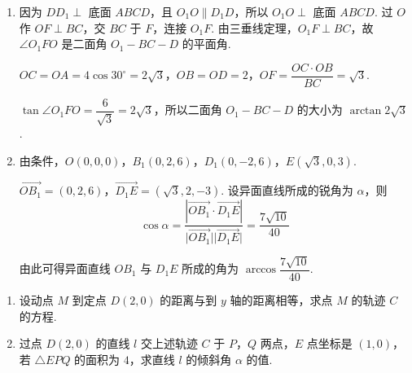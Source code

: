 \documentclass[UTF8,a4paper,oneside,11pt]{ctexbook}
\begin{document}
\begin{solution}
\begin{enumerate}
\item 因为 \(DD_1\perp\) 底面 \(ABCD\)，且 \(O_1O\parallel D_1D\)，所以 \(O_1O\perp\) 底面 \(ABCD\). 过 \(O\) 作 \(OF\perp BC\)，交 \(BC\) 于 \(F\)，连接 \(O_1F\). 由三垂线定理，\(O_1F\perp BC\)，故 \(\angle O_1FO\) 是二面角 \(O_1-BC-D\) 的平面角.

\(OC=OA=4\cos30^{\circ}=2\sqrt{3}\)，\(OB=OD=2\)，\(OF=\dfrac{OC\cdot OB}{BC}=\sqrt{3}\).

\(\tan\angle O_1FO=\dfrac{6}{\sqrt{3}}=2\sqrt{3}\)，所以二面角 \(O_1-BC-D\) 的大小为 \(\arctan 2\sqrt{3}\).

\item 由条件，\(O(0,0,0)\)，\(B_1(0,2,6)\)，\(D_1(0,-2,6)\)，\(E(\sqrt{3},0,3)\).

\(\overrightarrow{OB_1}=(0,2,6)\)，\(\overrightarrow{D_1E}=(\sqrt{3},2,-3)\). 设异面直线所成的锐角为 \(\alpha\)，则
\[
\cos\alpha=\frac{\left\lvert\overrightarrow{OB_1}\cdot\overrightarrow{D_1E}\right\rvert}{\lvert\overrightarrow{OB_1}\rvert\lvert\overrightarrow{D_1E}\rvert}=\frac{7\sqrt{10}}{40}
\]

由此可得异面直线 \(OB_1\) 与 \(D_1E\) 所成的角为 \(\arccos\dfrac{7\sqrt{10}}{40}\).
\end{enumerate}
\end{solution}

\begin{problem}
\begin{enumerate}
\item 设动点 \(M\) 到定点 \(D(2,0) \) 的距离与到 \(y\) 轴的距离相等，求点 \(M\) 的轨迹 \(C\) 的方程.
\item 过点 \(D(2,0)\) 的直线 \(l\) 交上述轨迹 \(C\) 于 \(P\)，\(Q\) 两点，\(E\) 点坐标是 \((1,0)\)，若 \(\triangle EPQ\) 的面积为 \(4\)，求直线 \(l\) 的倾斜角 \(\alpha\) 的值.
\end{enumerate}
\end{problem}
\end{document}
